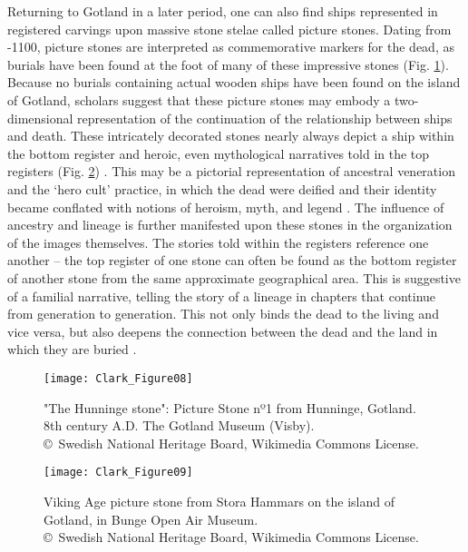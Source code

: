 Returning to Gotland in a later period, one can also find ships represented in registered carvings upon massive stone stelae called picture stones. Dating from -1100, picture stones are interpreted as commemorative markers for the dead, as burials have been found at the foot of many of these impressive stones (Fig. \ref{fig:Clark_Figure08}). Because no burials containing actual wooden ships have been found on the island of Gotland, scholars suggest that these picture stones may embody a two-dimensional representation of the continuation of the relationship between ships and death. These intricately decorated stones nearly always depict a ship within the bottom register and heroic, even mythological narratives told in the top registers (Fig. \ref{fig:Clark_Figure09})
\parencite[396--398]{Skoglund_2008}.
This may be a pictorial representation of ancestral veneration and the ‘hero cult’ practice, in which the dead were deified and their identity became conflated with notions of heroism, myth, and legend \parencite[177]{Sundqvist_2015}.
The influence of ancestry and lineage is further manifested upon these stones in the organization of the images themselves. The stories told within the registers reference one another – the top register of one stone can often be found as the bottom register of another stone from the same approximate geographical area. This is suggestive of a familial narrative, telling the story of a lineage in chapters that continue from generation to generation. This not only binds the dead to the living and vice versa, but also deepens the connection between the dead and the land in which they are buried \parencite{Price_2012a}.

\begin{figure}[!htb]
	\texttt{[image: Clark\_Figure08]}
	\caption{"The Hunninge stone": Picture Stone nº1 from Hunninge, Gotland. 8th century A.D. The Gotland Museum (Visby).
		{\normalfont\scriptsize \\ \copyright\ Swedish National Heritage Board, Wikimedia Commons License.
	}}
	\label{fig:Clark_Figure08}
\end{figure}

\begin{figure}[!htb]
	\texttt{[image: Clark\_Figure09]}
	\caption{Viking Age picture stone from Stora Hammars on the island of Gotland, in Bunge Open Air Museum.
		{\normalfont\scriptsize \\ \copyright\ Swedish National Heritage Board, Wikimedia Commons License.
	}}
	\label{fig:Clark_Figure09}
\end{figure}

